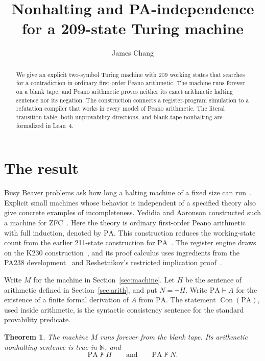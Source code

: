 \documentclass[11pt,letterpaper]{article}
\title{Nonhalting and PA-independence\\for a 209-state Turing machine}
\author{James Chang}
\date{}
\newtheorem{theorem}{Theorem}[section]
\newcommand{\PA}{\mathrm{PA}}
\newcommand{\N}{\mathbb{N}}
\newcommand{\Con}{\operatorname{Con}}
\begin{document}
\maketitle

\begin{abstract}
We give an explicit two-symbol Turing machine with 209 working states
that searches for a contradiction in ordinary first-order Peano
arithmetic. The machine runs forever on a blank tape, and Peano
arithmetic proves neither its exact arithmetic halting sentence nor
its negation. The construction connects a register-program simulation
to a refutation compiler that works in every model of Peano arithmetic.
The literal transition table, both unprovability directions, and
blank-tape nonhalting are formalized in Lean~4.
\end{abstract}

\section{The result}\label{sec:result}

Busy Beaver problems ask how long a halting machine of a fixed size can
run~\cite{rado}. Explicit small machines whose behavior is independent of
a specified theory also give concrete examples of incompleteness.
Yedidia and Aaronson constructed such a machine for ZFC~\cite{yedidia}.
Here the theory is ordinary first-order Peano arithmetic with full
induction, denoted by $\PA$. This construction reduces the working-state
count from the earlier 211-state construction for $\PA$~\cite{pa211}.
The register engine draws on the K230 construction~\cite{k230}, and
its proof calculus uses ingredients from the PA238 development~\cite{pa238}
and Reshetnikov's restricted implication proof~\cite{proveit}.

Write $M$ for the machine in Section~\ref{sec:machine}. Let $H$ be the
sentence of arithmetic defined in Section~\ref{sec:arith}, and put
$N=\neg H$. Write $\PA\vdash A$ for the existence of a finite formal
derivation of $A$ from $\PA$. The statement $\Con(\PA)$, used inside
arithmetic, is the syntactic consistency sentence for the standard
provability predicate.

\begin{theorem}\label{thm:main}
The machine $M$ runs forever from the blank tape. Its arithmetic
nonhalting sentence is true in $\N$, and
\[
                 \PA\nvdash H \qquad\text{and}\qquad \PA\nvdash N .
\]
\end{theorem}
\end{document}
